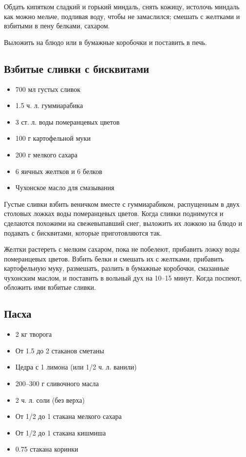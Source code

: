 Обдать кипятком сладкий и горький миндаль, снять кожицу, истолочь миндаль как можно мельче, подливая воду, чтобы не замаслился; смешать с желтками и взбитыми в пену белками, сахаром.

Выложить на блюдо или в бумажные коробочки и поставить в печь.

\subsection{Взбитые сливки с бисквитами}

\begin{itemize}
	\item 700 мл густых сливок 
    \item 1.5 ч. л. гуммиарабика
    \item 3 ст. л. воды померанцевых цветов
    \item 100 г картофельной муки
    \item 200 г мелкого сахара
    \item 6 яичных желтков и 6 белков 
    \item Чухонское масло для смазывания
\end{itemize}

Густые сливки взбить веничком вместе с гуммиарабиком, распущенным в двух столовых ложках воды померанцевых цветов. Когда сливки поднимутся и сделаются похожими на свежевыпавший снег, выложить их ложкою на блюдо и подавать с бисквитами, которые приготовляются так.

Желтки растереть с мелким сахаром, пока не побелеют, прибавить ложку воды померанцевых цветов. Взбить белки и смешать их с желтками, прибавить картофельную муку, размешать, разлить в бумажные коробочки, смазанные чухонским маслом, и поставить в вольный дух на 10–15 минут. Когда поспеют, обложить ими взбитые сливки.

\subsection{Пасха}

\begin{itemize}
	\item 2 кг творога 
    \item От 1.5 до 2 стаканов сметаны 
    \item Цедра с 1 лимона (или 1/2 ч. л. ванили)
    \item 200–300 г сливочного масла 
    \item 2 ч. л. соли (без верха)
    \item От 1/2 до 1 стакана мелкого сахара
    \item От 1/2 до 1 стакана кишмиша 
    \item 0.75 стакана коринки
\end{itemize}

